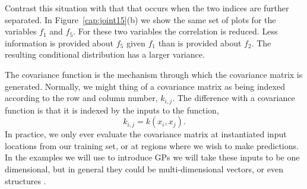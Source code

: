 Contrast this situation with that that occurs when the two indices are
further separated. In Figure~\ref{cap:joint15}(b) we show the same set
of plots for the variables $f_{1}$ and $f_{5}$. For these two
variables the correlation is reduced. Less information is provided
about $f_{5}$ given $f_{1}$ than is provided about $f_{2}$. The
resulting conditional distribution has a larger variance.

The covariance function is the mechanism through which the covariance
matrix is generated. Normally, we might thing of a covariance matrix
as being indexed according to the row and column number,
$k_{i,j}$. The difference with a covariance function is that it is
indexed by the inputs to the function,
\[
k_{i,j}=k\left(x_{i},x_{j}\right).
\] 
In practice, we only ever evaluate the covariance matrix at
instantiated input locations from our training set, or at regions
where we wish to make predictions. In the examples we will use to
introduce GPs we will take these inputs to be one dimensional, but in
general they could be multi-dimensional vectors, or even structures \cite{structural kernel material}.

